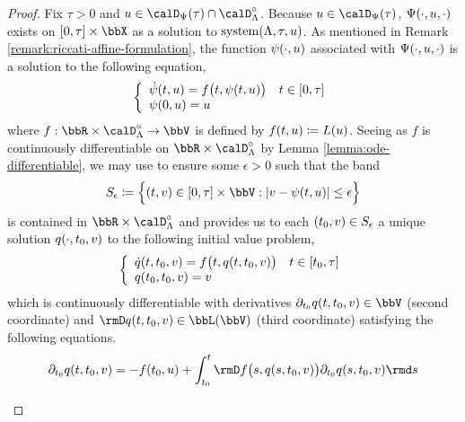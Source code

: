 \begin{proof}
  \label{proof:proposition:momentSpace-facts}
  Fix $\tau > 0$ and $\momentVar \in \momentSpace(\tau) \cap \odeSpace^\circ$.
  Because $\momentVar \in \momentSpace(\tau)$, $\Psi(\cdot,u,\cdot)$ exists on $[0,\tau]\times\stateSpace$ as a solution to $\operatorname{system}(\Lambda,\tau,u)$.
  As mentioned in Remark \ref{remark:riccati-affine-formulation}, the function $\psi(\cdot,u)$ associated with $\Psi(\cdot,u,\cdot)$ is a solution to the following equation,
  \begin{equation}
    \label{eq:system'}
    \left\{\begin{array}{ll}
      \dot{\psi}(t,u) = f\big(t, \psi(t,u)\big) & t \in [0,\tau] \\
      \psi(0,u) = u
    \end{array}\right.
  \end{equation}
  where $f: \bbR \times \odeSpace^\circ \rightarrow \vecSpace$ is defined by $f(t, u) \coloneqq L(u)$.
  Seeing as $f$ is continuously differentiable on $\bbR \times \odeSpace^\circ$ by Lemma \ref{lemma:ode-differentiable}, we may use \cite[III.13 Theorem X]{walter1998} to ensure some $\epsilon > 0$ such that the band
  \begin{equation*}
    S_\epsilon \defeq \Big\{ (t, \vecVar) \in [0,\tau] \times \vecSpace : |\vecVar-\affPart(t,\momentVar)| \leq \epsilon \Big\}
  \end{equation*}
  is contained in $\bbR \times \odeSpace^\circ$ and provides us to each $(t_0, v) \in S_\epsilon$ a unique solution $q(\cdot,t_0,v)$ to the following initial value problem,
  \begin{equation*}
    \left\{\begin{array}{ll}
      \dot q(t,t_0,v) = f\big(t, q(t,t_0,v)\big) & t \in [t_0,\tau] \\
      q(t_0,t_0,v) = v
    \end{array}\right.
  \end{equation*}
  which is continuously differentiable with derivatives $\partial_{t_0} q(t,t_0,\vecVar) \in \vecSpace$ (second coordinate) and $\Der q(t,t_0,\vecVar) \in \bbL(\vecSpace)$ (third coordinate) satisfying the following equations.
  \begin{align*}
    \partial_{t_0} q(t, t_0, \vecVar) 
    &= -f(t_0,\momentVar) + \int_{t_0}^t \Der f\big(s, q(s,t_0,\vecVar) \big) \partial_{t_0} q(s,t_0, \vecVar) \rmd s \\[0.5em]

\end{align*}
\end{proof}
